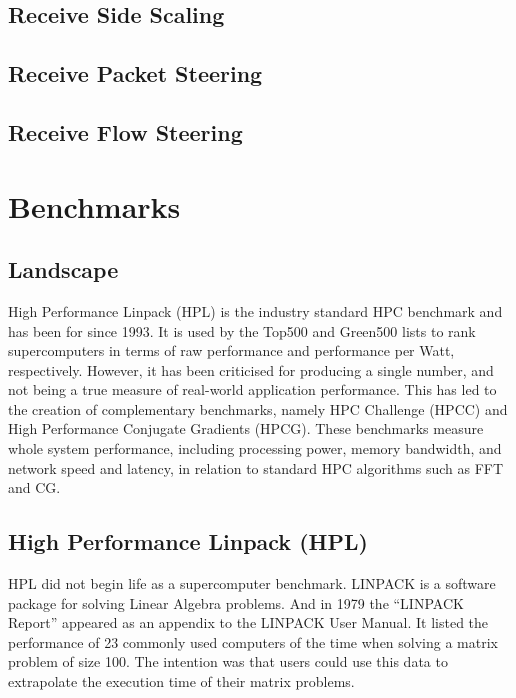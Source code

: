\subsection{Receive Side Scaling}

\subsection{Receive Packet Steering}

\subsection{Receive Flow Steering}


%
%
\section{Benchmarks}

\subsection{Landscape}

High Performance Linpack (HPL) is the industry standard HPC benchmark and has been for since 1993. It is used by the Top500 and Green500 lists to rank supercomputers in terms of raw performance and performance per Watt, respectively. However, it has been criticised for producing a single number, and not being a true measure of real-world application performance. This has led to the creation of complementary benchmarks, namely HPC Challenge (HPCC) and High Performance Conjugate Gradients (HPCG). These benchmarks measure whole system performance, including processing power, memory bandwidth, and network speed and latency, in relation to standard HPC algorithms such as FFT and CG.


%
%
\subsection{High Performance Linpack (HPL)}

HPL did not begin life as a supercomputer benchmark. LINPACK is a software package for solving Linear Algebra problems. And in 1979 the ``LINPACK Report'' appeared as an appendix to the LINPACK User Manual. It listed the performance of 23 commonly used computers of the time when solving a matrix problem of size 100. The intention was that users could use this data to extrapolate the execution time of their matrix problems.

